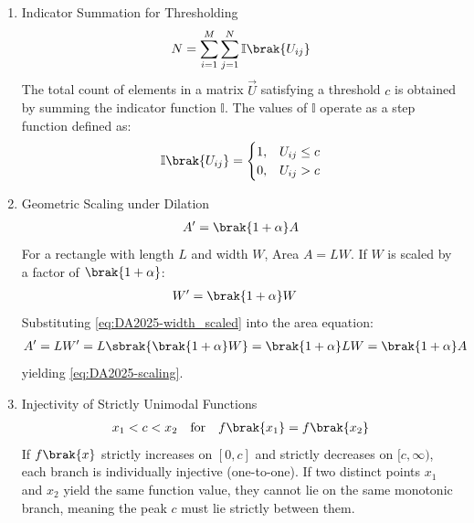 \begin{enumerate}[label=\thesubsection.\arabic*, ref=\thesubsection.\theenumi]
	
	\item Indicator Summation for Thresholding
	\begin{align}
		N = \sum_{i=1}^M \sum_{j=1}^N \mathbb{I}\brak{U_{ij}} \label{eq:DA2025-threshold}
	\end{align}
	\solution
	The total count of elements in a matrix $\vec{U}$ satisfying a threshold $c$ is obtained by summing the indicator function $\mathbb{I}$. The values of $\mathbb{I}$ operate as a step function defined as:
	\begin{align}
		\mathbb{I}\brak{U_{ij}} = \begin{cases} 
			1, & U_{ij} \le c \\ 
			0, & U_{ij} > c 
		\end{cases} \label{eq:DA2025-indicator_step}
	\end{align}
	
	\item Geometric Scaling under Dilation
	\begin{align}
		A' = \brak{1 + \alpha}A \label{eq:DA2025-scaling}
	\end{align}
	\solution
	For a rectangle with length $L$ and width $W$, Area $A = LW$. If $W$ is scaled by a factor of $\brak{1 + \alpha}$:
	\begin{align}
		W' &= \brak{1 + \alpha}W \label{eq:DA2025-width_scaled}
	\end{align}
	Substituting \eqref{eq:DA2025-width_scaled} into the area equation:
	\begin{align}
		A' &= L W' = L \sbrak{\brak{1 + \alpha}W} = \brak{1 + \alpha}LW = \brak{1 + \alpha}A
	\end{align}
	yielding \eqref{eq:DA2025-scaling}.
	
	\item Injectivity of Strictly Unimodal Functions
	\begin{align}
		x_1 < c < x_2 \quad \text{for} \quad f\brak{x_1} = f\brak{x_2} \label{eq:DA2025-unimodal}
	\end{align}
	\solution
	If $f\brak{x}$ strictly increases on $[0, c]$ and strictly decreases on $[c, \infty)$, each branch is individually injective (one-to-one). If two distinct points $x_1$ and $x_2$ yield the same function value, they cannot lie on the same monotonic branch, meaning the peak $c$ must lie strictly between them.
	

\end{enumerate}
